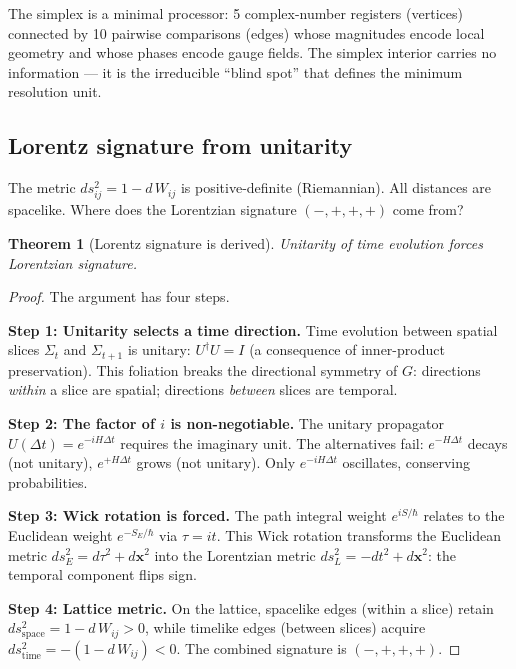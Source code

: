 \documentclass[12pt]{article}
\newtheorem{theorem}{Theorem}[section]
\theoremstyle{remark}
\theoremstyle{definition}
\begin{document}
The simplex is a minimal processor: 5 complex-number registers (vertices) connected by 10 pairwise comparisons (edges) whose magnitudes encode local geometry and whose phases encode gauge fields. The simplex interior carries no information --- it is the irreducible ``blind spot'' that defines the minimum resolution unit.

\subsection{Lorentz signature from unitarity}
\label{sec:Lorentz}

The metric $ds^2_{ij} = 1 - d\,W_{ij}$ is positive-definite (Riemannian). All distances are spacelike. Where does the Lorentzian signature $(-,+,+,+)$ come from?

\begin{theorem}[Lorentz signature is derived]
Unitarity of time evolution forces Lorentzian signature.
\end{theorem}

\begin{proof}
The argument has four steps.

\medskip
\noindent\textbf{Step 1: Unitarity selects a time direction.}
Time evolution between spatial slices $\Sigma_t$ and $\Sigma_{t+1}$ is unitary: $U^\dagger U = I$ (a consequence of inner-product preservation). This foliation breaks the directional symmetry of $G$: directions \emph{within} a slice are spatial; directions \emph{between} slices are temporal.

\medskip
\noindent\textbf{Step 2: The factor of $i$ is non-negotiable.}
The unitary propagator $U(\Delta t) = e^{-iH\Delta t}$ requires the imaginary unit. The alternatives fail: $e^{-H\Delta t}$ decays (not unitary), $e^{+H\Delta t}$ grows (not unitary). Only $e^{-iH\Delta t}$ oscillates, conserving probabilities.

\medskip
\noindent\textbf{Step 3: Wick rotation is forced.}
The path integral weight $e^{iS/\hbar}$ relates to the Euclidean weight $e^{-S_E/\hbar}$ via $\tau = it$. This Wick rotation transforms the Euclidean metric $ds^2_E = d\tau^2 + d\mathbf{x}^2$ into the Lorentzian metric $ds^2_L = -dt^2 + d\mathbf{x}^2$: the temporal component flips sign.

\medskip
\noindent\textbf{Step 4: Lattice metric.}
On the lattice, spacelike edges (within a slice) retain $ds^2_\text{space} = 1 - d\,W_{ij} > 0$, while timelike edges (between slices) acquire $ds^2_\text{time} = -(1 - d\,W_{ij}) < 0$. The combined signature is $(-,+,+,+)$.
\end{proof}
\end{document}
